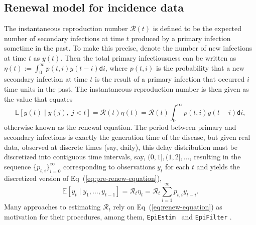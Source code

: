 \documentclass[10pt,letterpaper]{article}
\def\EpiEstim{\texttt{EpiEstim}}
\def\bbE{\mathbb{E}}
\def\calR{\mathcal{R}}
\def\diff{\mathsf{d}}
\renewcommand{\eqref}[1]{Eq~(\ref{#1})}
\begin{document}
\subsection{Renewal model for incidence data} 

The instantaneous reproduction number $\calR(t)$ is defined to be the expected
number of secondary infections at time $t$ produced by a primary infection
sometime in the past. To make this precise, denote the number of new infections
at time $t$ as $y(t)$. Then the total primary infectiousness can be written as
$\eta(t) := \int_0^{\infty} p(t,i) y(t-i) \diff i$, where $p(t,i)$ is the
probability that a new secondary infection at time $t$ is the result of a
primary infection that occurred $i$ time units in the past. The instantaneous
reproduction number is then given as the value that equates
\begin{equation} \label{eq:pre-renew-equation}
  \bbE[y(t) \mid y(j),\ j<t]=\calR(t)\eta(t)=\calR(t)\int_0^\infty p(t,i)y(t-i)\diff i,
\end{equation}
otherwise known as the renewal equation. The period between primary and
secondary infections is exactly the generation time of the disease, but given
real data, observed at discrete times (say, daily), this delay distribution must
be discretized into contiguous time intervals, say, $(0,1], (1,2], \ldots$,
resulting in the sequence $\{p_{t,i}\}_{i=0}^\infty$ corresponding to
observations $y_t$ for each $t$ and yields the discretized version of
\eqref{eq:pre-renew-equation},
\begin{equation} \label{eq:renew-equation}
  \bbE[y_t \mid y_1,\ldots,y_{t-1}]=\calR_t\eta_t=\calR_t\sum_{i = 1}^\infty p_{t,i} y_{t-i}.
\end{equation}
Many approaches to estimating $\calR_t$ rely on \eqref{eq:renew-equation} as
motivation for their procedures, among them, \EpiEstim\ \cite{cori2013new} 
and \texttt{EpiFilter} \cite{parag2021improved}. 
\end{document}
